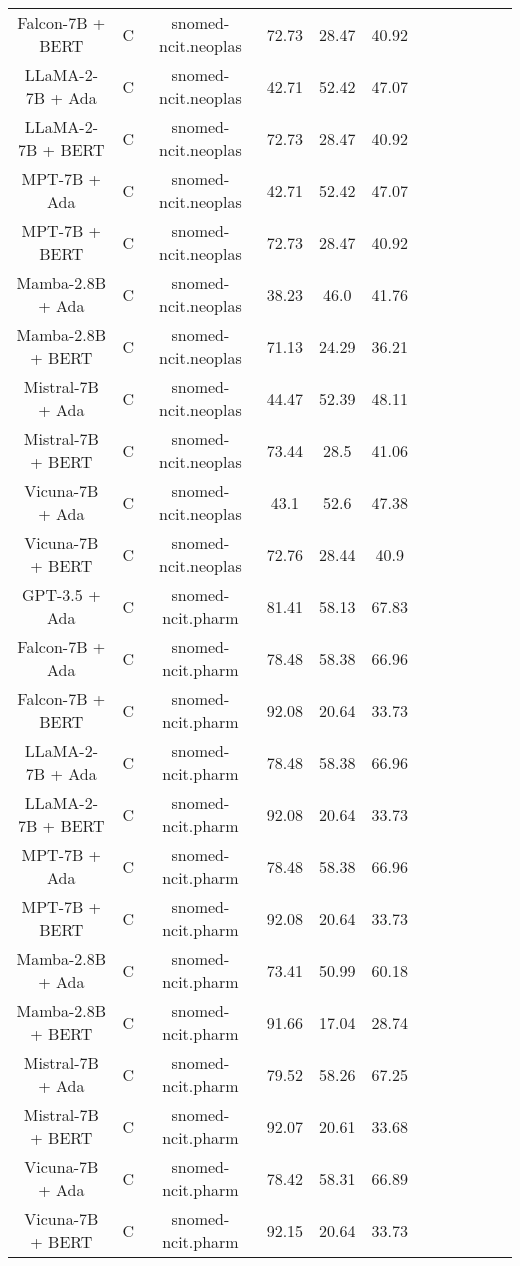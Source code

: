 \begin{table}
\begin{tabular}{|c|c|c|c|c|c|c|c|c|c|c|c|}
	Falcon-7B + BERT  & C & snomed-ncit.neoplas  &  72.73 &  28.47 & 40.92  \\
	LLaMA-2-7B + Ada  & C & snomed-ncit.neoplas  &  42.71 &  52.42 & 47.07  \\
	LLaMA-2-7B + BERT  & C & snomed-ncit.neoplas  &  72.73 &  28.47 & 40.92  \\
	MPT-7B + Ada  & C & snomed-ncit.neoplas  &  42.71 &  52.42 & 47.07  \\
	MPT-7B + BERT  & C & snomed-ncit.neoplas  &  72.73 &  28.47 & 40.92  \\
	Mamba-2.8B + Ada  & C & snomed-ncit.neoplas  &  38.23 &  46.0 & 41.76  \\
	Mamba-2.8B + BERT  & C & snomed-ncit.neoplas  &  71.13 &  24.29 & 36.21  \\
	Mistral-7B + Ada  & C & snomed-ncit.neoplas  &  44.47 &  52.39 & 48.11  \\
	Mistral-7B + BERT  & C & snomed-ncit.neoplas  &  73.44 &  28.5 & 41.06  \\
	Vicuna-7B + Ada  & C & snomed-ncit.neoplas  &  43.1 &  52.6 & 47.38  \\
	Vicuna-7B + BERT  & C & snomed-ncit.neoplas  &  72.76 &  28.44 & 40.9  \\
	\hline
	GPT-3.5 + Ada  & C & snomed-ncit.pharm  &  81.41 &  58.13 & 67.83  \\
	Falcon-7B + Ada  & C & snomed-ncit.pharm  &  78.48 &  58.38 & 66.96  \\
	Falcon-7B + BERT  & C & snomed-ncit.pharm  &  92.08 &  20.64 & 33.73  \\
	LLaMA-2-7B + Ada  & C & snomed-ncit.pharm  &  78.48 &  58.38 & 66.96  \\
	LLaMA-2-7B + BERT  & C & snomed-ncit.pharm  &  92.08 &  20.64 & 33.73  \\
	MPT-7B + Ada  & C & snomed-ncit.pharm  &  78.48 &  58.38 & 66.96  \\
	MPT-7B + BERT  & C & snomed-ncit.pharm  &  92.08 &  20.64 & 33.73  \\
	Mamba-2.8B + Ada  & C & snomed-ncit.pharm  &  73.41 &  50.99 & 60.18  \\
	Mamba-2.8B + BERT  & C & snomed-ncit.pharm  &  91.66 &  17.04 & 28.74  \\
	Mistral-7B + Ada  & C & snomed-ncit.pharm  &  79.52 &  58.26 & 67.25  \\
	Mistral-7B + BERT  & C & snomed-ncit.pharm  &  92.07 &  20.61 & 33.68  \\
	Vicuna-7B + Ada  & C & snomed-ncit.pharm  &  78.42 &  58.31 & 66.89  \\
	Vicuna-7B + BERT  & C & snomed-ncit.pharm  &  92.15 &  20.64 & 33.73  \\
	\hline
\end{tabular}
    \end{table}









